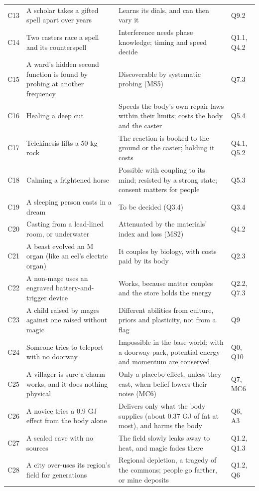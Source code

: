 \begin{longtable}{@{}>{\raggedright\arraybackslash}p{}>{\raggedright\arraybackslash}p{}>{\raggedright\arraybackslash}p{}>{\raggedright\arraybackslash}p{}@{}}
C13 & A scholar takes a gifted spell apart over years & Learns its dials, and can then vary it & Q9.2\\
C14 & Two casters race a spell and its counterspell & Interference needs phase knowledge; timing and speed decide & Q1.1, Q4.2\\
C15 & A ward's hidden second function is found by probing at another frequency & Discoverable by systematic probing (MS5) & Q7.3\\
C16 & Healing a deep cut & Speeds the body's own repair laws within their limits; costs the body and the caster & Q5.4\\
C17 & Telekinesis lifts a 50 kg rock & The reaction is booked to the ground or the caster; holding it costs & Q4.1, Q5.2\\
C18 & Calming a frightened horse & Possible with coupling to its mind; resisted by a strong state; consent matters for people & Q5.3\\
C19 & A sleeping person casts in a dream & To be decided (Q3.4) & Q3.4\\
C20 & Casting from a lead-lined room, or underwater & Attenuated by the materials' index and loss (MS2) & Q4.2\\
C21 & A beast evolved an M organ (like an eel's electric organ) & It couples by biology, with costs paid by its body & Q2.3\\
C22 & A non-mage uses an engraved battery-and-trigger device & Works, because matter couples and the store holds the energy & Q2.2, Q7.3\\
C23 & A child raised by mages against one raised without magic & Different abilities from culture, priors and plasticity, not from a flag & Q9\\
C24 & Someone tries to teleport with no doorway & Impossible in the base world; with a doorway pack, potential energy and momentum are conserved & Q0, Q10\\
C25 & A villager is sure a charm works, and it does nothing physical & Only a placebo effect, unless they cast, when belief lowers their noise (MC6) & Q7, MC6\\
C26 & A novice tries a 0.9 GJ effect from the body alone & Delivers only what the body supplies (about 0.37 GJ of fat at most), and harms the body & Q6, A3\\
C27 & A sealed cave with no sources & The field slowly leaks away to heat, and magic fades there & Q1.2, Q1.3\\
C28 & A city over-uses its region's field for generations & Regional depletion, a tragedy of the commons; people go farther, or mine deposits & Q1.2, Q6\\

\end{longtable}
